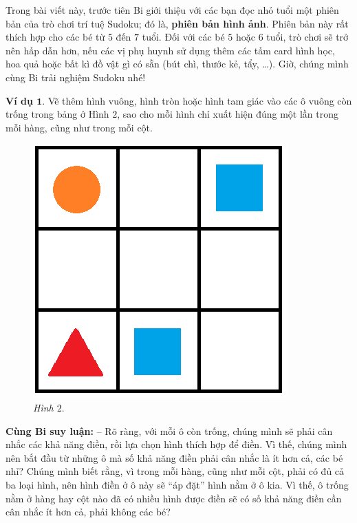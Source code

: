 	\vskip 0.1cm
	Trong bài viết này, trước tiên Bi giới thiệu với các bạn đọc nhỏ tuổi một phiên bản của trò chơi trí tuệ Sudoku; đó là, \textbf{phiên bản hình ảnh}. Phiên bản này rất thích hợp cho các bé từ $5$ đến $7$ tuổi.
	\vskip 0.1cm
	Đối với các bé $5$ hoặc $6$ tuổi, trò chơi sẽ trở nên hấp dẫn hơn, nếu các vị phụ huynh sử dụng thêm các tấm card hình học, hoa quả hoặc bất kì đồ vật gì có sẵn (bút chì, thước kẻ, tẩy, \ldots).
	\vskip 0.15cm
	Giờ, chúng mình cùng Bi trải nghiệm  Sudoku nhé!
	\begin{multicols}{2}
		\textbf{Ví dụ $\pmb 1.$} Vẽ thêm hình vuông, hình tròn hoặc hình tam giác vào các ô vuông còn trống trong bảng ở Hình $2$, sao cho mỗi hình chỉ xuất hiện đúng một lần trong mỗi hàng, cũng như trong mỗi cột.
		\begin{figure}[H]
			\vspace*{5pt}
			\centering
			\captionsetup{labelformat=empty, justification=centering}
			\includegraphics[scale=0.33]{hinh2}
			\caption{\textit{\small Hình $2.$}}
			\vspace*{-10pt}
		\end{figure}
	\end{multicols}
	\textbf{Cùng Bi suy luận:}
	\vskip 0.15cm
	-- Rõ ràng, với mỗi ô còn trống, chúng mình sẽ phải cân nhắc các khả năng điền, rồi lựa chọn hình thích hợp để điền. Vì thế, chúng mình nên bắt đầu từ những ô mà số khả năng điền phải cân nhắc là ít hơn cả, các bé nhỉ? Chúng mình biết rằng, vì trong mỗi hàng, cũng như mỗi cột, phải có đủ cả ba loại hình, nên hình điền ở ô này sẽ “áp đặt” hình nằm ở ô kia. Vì thế, ô trống nằm ở hàng hay cột nào đã có nhiều hình được điền sẽ có số khả năng điền cần cân nhắc ít hơn cả, phải không các bé?
